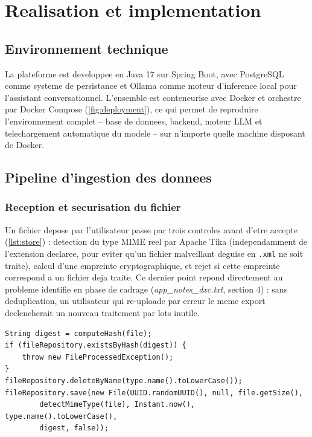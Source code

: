 \chapter{Realisation et implementation}
\label{chap:realisation}

\section{Environnement technique}

La plateforme est developpee en Java 17 sur Spring Boot, avec PostgreSQL comme
systeme de persistance et Ollama comme moteur d'inference local pour l'assistant
conversationnel. L'ensemble est conteneurise avec Docker et orchestre par Docker
Compose (\cref{fig:deployment}), ce qui permet de reproduire l'environnement complet
-- base de donnees, backend, moteur LLM et telechargement automatique du modele --
sur n'importe quelle machine disposant de Docker.

\section{Pipeline d'ingestion des donnees}
\label{sec:pipeline-ingestion}

\subsection{Reception et securisation du fichier}

Un fichier depose par l'utilisateur passe par trois controles avant d'etre accepte
(\cref{lst:store}) : detection du type MIME reel par Apache Tika (independamment de
l'extension declaree, pour eviter qu'un fichier malveillant deguise en
\texttt{.xml} ne soit traite), calcul d'une empreinte cryptographique, et rejet si
cette empreinte correspond a un fichier deja traite. Ce dernier point repond
directement au probleme identifie en phase de cadrage (\emph{app\_notes\_dxc.txt},
section 4) : sans deduplication, un utilisateur qui re-uploade par erreur le meme
export declencherait un nouveau traitement par lots inutile.

\begin{lstlisting}[caption={Deduplication par empreinte avant stockage (TempFileStorageServiceimpl)},label={lst:store}]
String digest = computeHash(file);
if (fileRepository.existsByHash(digest)) {
    throw new FileProcessedException();
}
fileRepository.deleteByName(type.name().toLowerCase());
fileRepository.save(new File(UUID.randomUUID(), null, file.getSize(),
        detectMimeType(file), Instant.now(), type.name().toLowerCase(),
        digest, false));
\end{lstlisting}

